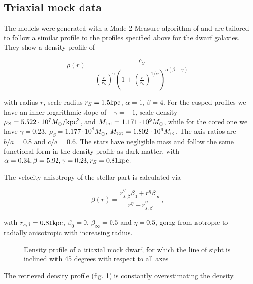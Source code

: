\subsection{Triaxial mock data}

The models were generated with a Made 2 Measure algorithm of
\cite{Dehnen2009} and are tailored to follow a similar profile to the
profiles specified above for the dwarf galaxies. They show a density
profile of

\begin{equation}
    \rho(r)=\frac{\rho_S}{\left(\frac{r}{r_S}\right)^\gamma\left(1+\left(\frac{r}{r_S}\right)^{1/\alpha}\right)^{\alpha(\beta-\gamma)}}
\end{equation}

with radius $r$, scale radius $r_S=1.5\mathrm{kpc}$, $\alpha=1$,
$\beta=4$. For the cusped profiles we have an inner logarithmic slope
of $-\gamma=-1$, scale density $\rho_S=5.522\cdot 10^7M_\odot/\mathrm{kpc}^3$,
and $M_{\mathrm{tot}}=1.171\cdot10^9M_\odot$, while for the cored one we have
$\gamma=0.23$, $\rho_S=1.177\cdot10^8M_\odot$,
$M_{\mathrm{tot}}=1.802\cdot10^9M_\odot$. The axis ratios are $b/a=0.8$ and
$c/a=0.6$. The stars have negligible mass and follow the same
functional form in the density profile as dark matter, with
$\alpha=0.34, \beta=5.92, \gamma=0.23, r_S=0.81\mathrm{kpc}$.

The velocity anisotropy of the stellar part is calculated via

\begin{equation}
\beta(r)=\frac{r_{s,\beta}^\eta \beta_0+r^\eta \beta_\infty}{r^\eta+r_{s,\beta}^\eta},
\end{equation}

with $r_{s,\beta}=0.81\mathrm{kpc}$, $\beta_0=0$, $\beta_\infty=0.5$ and
$\eta=0.5$, going from isotropic to radially anisotropic with
increasing radius.

\begin{figure}
    \begin{center}
        \hspace{-7mm}
        \caption{Density profile of a triaxial mock dwarf, for which the line
          of sight is inclined with 45 degrees with respect to all axes.}
        \label{fig:triax}
    \end{center}
\end{figure}

The retrieved density profile (fig. \ref{fig:triax}) is constantly
overestimating the density.



